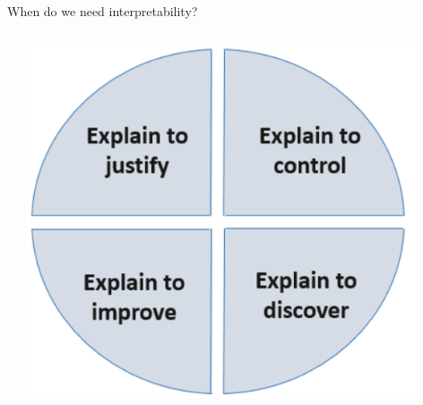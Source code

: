 \documentclass[11pt,compress,t,notes=noshow, aspectratio=169, xcolor=table]{beamer}
\begin{document}
\begin{frame}{When do we need interpretability?}
\begin{columns}[T]
\begin{column}{0.55\textwidth}
\begin{itemize}
\end{itemize}
\end{column}
\begin{column}{0.4\textwidth}  %
  \includegraphics[width=0.9\textwidth]{figure/explain-to}
   \centering {}
\end{column}
\end{columns}
\end{frame}




\end{document}
